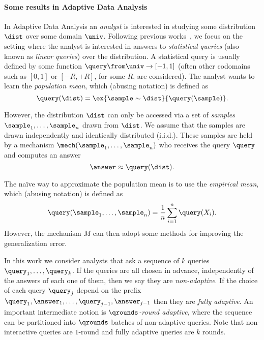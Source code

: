 


\paragraph{Some results in Adaptive Data Analysis}
In Adaptive Data Analysis an \emph{analyst} is interested in studying some distribution $\dist$ over some domain $\univ$.  Following previous works~\cite{DworkFHPRR15,HardtU14,BassilyNSSSU16}, we focus on the setting where the analyst is interested in answers to \emph{statistical queries} (also known as \emph{linear queries}) over the distribution.  A statistical query is usually defined by some function $\query \from \univ \to [-1,1]$ (often other codomains such as $[0,1]$ or $[-R,+R]$, for some $R$, are considered).  The analyst wants to learn the \emph{population mean}, which (abusing notation) is defined as $$\query(\dist) = \ex{\sample \sim \dist}{\query(\sample)}.$$

However, the distribution $\dist$ can only be accessed via a set of \emph{samples} $\sample_1,\dots,\sample_n$ drawn from $\dist$. We assume that the samples are drawn independently and identically distributed (i.i.d.).  These samples are held by a mechanism $\mech(\sample_1,\dots,\sample_n)$ who receives the query $\query$ and computes an answer 
$$\answer \approx \query(\dist).$$

The na\"ive way to approximate the population mean is to use the \emph{empirical mean}, which (abusing notation) is defined as $$\query(\sample_1,\dots,\sample_n) = \frac{1}{n} \sum_{i=1}^{n} \query(X_i).$$
However, the mechanism $M$ can then adopt some methods for improving the generalization error.

In this work we consider analysts that ask a sequence of $k$ queries $\query_1,\dots,\query_k$.  If the queries are all chosen in advance, independently of the answers of each one of them, then we say they are \emph{non-adaptive}.  If the choice of each query $\query_j$ depend on the prefix $\query_1,\answer_1,\dots,\query_{j-1},\answer_{j-1}$ then they are \emph{fully adaptive}.  An important intermediate notion is \emph{$\qrounds$-round adaptive}, where the sequence can be partitioned into $\qrounds$ batches of non-adaptive queries.  Note that non-interactive queries are $1$-round and fully adaptive queries are $k$ rounds.

